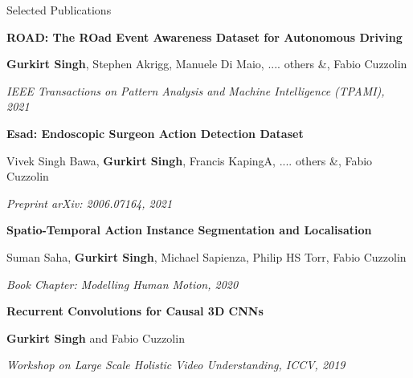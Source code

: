 \documentclass{resume} %
\begin{document}
\begin{rSection}{Selected Publications}


\vspace{-0.04in}
\textbf{ROAD: The ROad Event Awareness Dataset for Autonomous Driving}

\vspace{-0.1in}
\small{\textbf{Gurkirt Singh}, Stephen Akrigg, Manuele Di Maio, .... others \&,
Fabio Cuzzolin}

\vspace{-0.1in}
\textit{\small{IEEE Transactions on Pattern Analysis and Machine Intelligence (TPAMI), 2021}}

\vspace{-0.04in}
\textbf{Esad: Endoscopic Surgeon Action Detection Dataset}

\vspace{-0.1in}
\small{Vivek Singh Bawa, \textbf{Gurkirt Singh}, Francis KapingA, .... others \&, 
Fabio Cuzzolin}

\vspace{-0.1in}
\textit{\small{Preprint arXiv: 2006.07164, 2021}}

\vspace{-0.04in}
\small{\textbf{Spatio-Temporal Action Instance Segmentation and Localisation}

\vspace{-0.1in}
\small{Suman Saha, \textbf{Gurkirt Singh}, Michael Sapienza, Philip HS Torr, Fabio Cuzzolin}

\vspace{-0.1in}
\textit{\small{Book Chapter: Modelling Human Motion, 2020}}

\vspace{-0.04in}
\textbf{Recurrent Convolutions for Causal 3D CNNs}

\vspace{-0.1in}
\small{\textbf{Gurkirt Singh} and Fabio Cuzzolin}

\vspace{-0.1in}
\textit{\small{Workshop on Large Scale Holistic Video Understanding, ICCV, 2019}}


}
\end{rSection}
\end{document}
